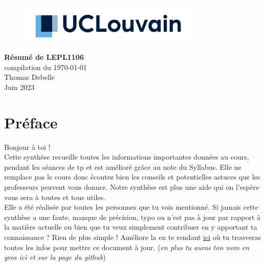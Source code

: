 \documentclass{report}
\begin{document}
\begin{titlepage}
    \begin{figure}
        \includegraphics[height = 2cm]{UCL_Logo.png}
        \label{fig:my_label}
    \end{figure}

    \hspace*{100cm}
    \centering
    \vspace*{7cm}

    {\Huge \textbf{Résumé de LEPL1106}}\\
    \vspace*{0.25cm}
    compilation du \today\\
    \vspace*{0.25cm}
    \Large{Thomas Debelle}\\

    \vspace*{9.5cm}
    {\Large Juin 2023}
\end{titlepage}


\tableofcontents
\newpage

\section*{Préface}

Bonjour à toi !\\

Cette synthèse recueille toutes les informations importantes données au cours, pendant les séances de tp et est amélioré grâce au note du Syllabus. Elle ne remplace pas le cours donc écoutez bien les conseils et potentielles astuces que les professeurs peuvent vous donner. Notre synthèse est plus une aide qui on l'espère vous sera à toutes et tous utiles.\\

Elle a été réalisée par toutes les personnes que tu vois mentionné. Si jamais cette synthèse a une faute, manque de précision, typo ou n'est pas à jour par rapport à la matière actuelle ou bien que tu veux simplement contribuer en y apportant ta connaissance ? Rien de plus simple ! Améliore la en te rendant \href{http://www.github.com/Tfloow/Q4_EPL}{ici} où tu trouveras toutes les infos pour mettre ce document à jour. (\textit{en plus tu auras ton nom en gros ici et sur la page du github})\\
\end{document}
